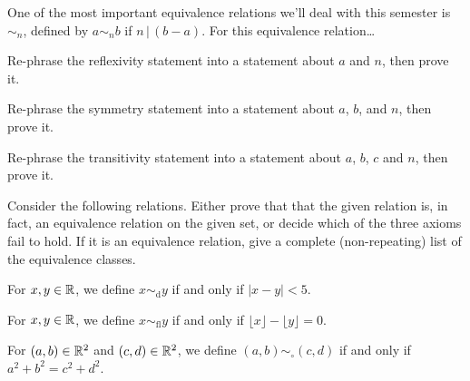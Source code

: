 \documentclass[12pt,letterpaper]{article}
\begin{document}
\thispagestyle{fancy}

\begin{center}
\end{center}
\bigskip

\begin{enumerate}
  \Problem One of the most important equivalence relations we'll deal
  with this semester is $\sim_{n}$, defined by $a \sim_n b$ if
  $n\,|\,(b-a)$. For this equivalence relation\ldots
  \begin{enumerate}
    \Part Re-phrase the reflexivity statement into a statement about
    $a$ and $n$, then prove it.
    \vfill

    \Part Re-phrase the symmetry statement into a statement about
    $a$, $b$, and $n$, then prove it.
    \vfill

    \Part Re-phrase the transitivity statement into a statement about
    $a$, $b$, $c$ and $n$, then prove it.
    \vfill

  \end{enumerate}

\end{enumerate}


\newpage


Consider the following relations.  Either prove that that the given
relation is, in fact, an equivalence relation on the given set, or
decide which of the three axioms fail to hold.  If it is an
equivalence relation, give a complete (non-repeating) list of the
equivalence classes.
\begin{enumerate}
  \Problem 
  For $x,y\in \mathbb{R}$, we define $x\sim_{\text{d}}y$ if and only if $|x-y|
  < 5$.  
  \vfill

  \Problem
  For $x,y\in \mathbb{R}$, we define $x\sim_{\text{fl}}y$ if and only if
  $\lfloor x \rfloor - \lfloor y \rfloor =0$.  
  \vfill

  \Problem 
  For $(a,b)\in \mathbb{R}^2$ and $(c,d)\in \mathbb{R}^2$, we define
  $(a,b)\sim_{\circ}(c,d)$ if and only if $a^2+b^2=c^2+d^2$. 
  \vfill

\end{enumerate}
\end{document}
